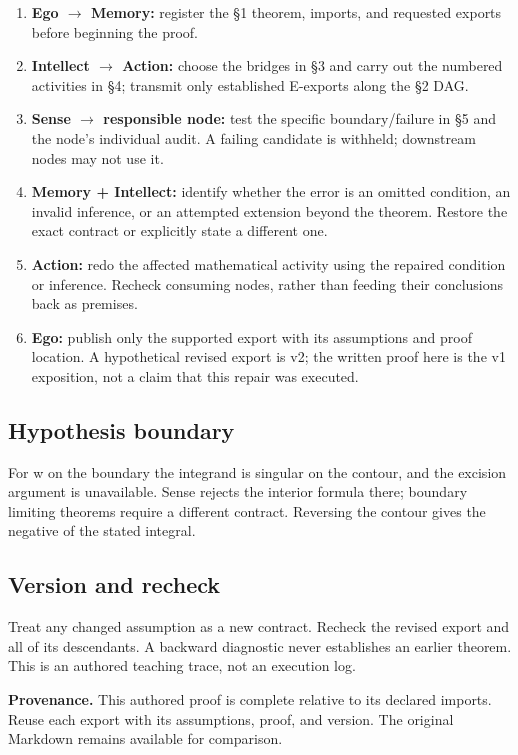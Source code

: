 \documentclass[preprint,12pt,aps,pra,showkeys,amsmath,amssymb,superscriptaddress,floatfix]{revtex4-2}
\theoremstyle{definition}
\theoremstyle{remark}
\providecommand{\tightlist}{\setlength{\itemsep}{2pt}\setlength{\parskip}{0pt}}
\begin{document}
\begin{enumerate}
\def\labelenumi{\arabic{enumi}.}
\tightlist
\item
  \textbf{Ego \(\to\) Memory:} register the §1 theorem, imports, and
  requested exports before beginning the proof.
\item
  \textbf{Intellect \(\to\) Action:} choose the bridges in §3 and carry
  out the numbered activities in §4; transmit only established E-exports
  along the §2 DAG.
\item
  \textbf{Sense \(\to\) responsible node:} test the specific
  boundary/failure in §5 and the node's individual audit. A failing
  candidate is withheld; downstream nodes may not use it.
\item
  \textbf{Memory + Intellect:} identify whether the error is an omitted
  condition, an invalid inference, or an attempted extension beyond the
  theorem. Restore the exact contract or explicitly state a different
  one.
\item
  \textbf{Action:} redo the affected mathematical activity using the
  repaired condition or inference. Recheck consuming nodes, rather than
  feeding their conclusions back as premises.
\item
  \textbf{Ego:} publish only the supported export with its assumptions
  and proof location. A hypothetical revised export is v2; the written
  proof here is the v1 exposition, not a claim that this repair was
  executed.
\end{enumerate}

\subsection{Hypothesis boundary}
For w on the boundary the integrand is singular on the contour, and the
excision argument is unavailable. Sense rejects the interior formula
there; boundary limiting theorems require a different contract.
Reversing the contour gives the negative of the stated integral.

\subsection{Version and recheck}
Treat any changed assumption as a new contract. Recheck the revised
export and all of its descendants. A backward diagnostic never
establishes an earlier theorem. This is an authored teaching trace, not
an execution log.

\par\medskip\begingroup\small\linespread{1.0}\selectfont\noindent\textbf{Provenance.} This authored proof is complete relative to its declared imports. Reuse
each export with its assumptions, proof, and version. The original
Markdown remains available for comparison.
\par\endgroup
\end{document}
